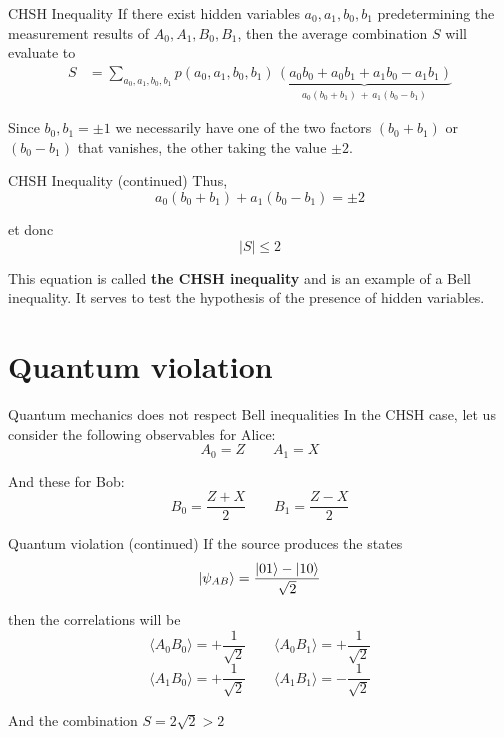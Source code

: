 \documentclass[aspectratio=169,12pt]{beamer}
\begin{document}
\begin{frame}{CHSH Inequality}
  If there exist hidden variables $a_0,a_1,b_0,b_1$ predetermining the measurement results of $A_0,A_1,B_0,B_1$, then the average combination $S$ will evaluate to
  \begin{align*}
    S &= \sum_{a_0,a_1,b_0,b_1} p(a_0,a_1,b_0,b_1) \, \underbrace{(a_0b_0+ a_0b_1 + a_1b_0 - a_1b_1)}_{a_0(b_0+b_1) \, + \, a_1(b_0-b_1)}
  \end{align*}
  
  Since $b_0,b_1 = \pm 1$ we necessarily have one of the two factors $(b_0+b_1)$ or $(b_0-b_1)$ that vanishes, the other taking the value $\pm 2$.
\end{frame}

\begin{frame}{CHSH Inequality (continued)}
  Thus,
  \[
    a_0(b_0+b_1) + a_1(b_0-b_1) = \pm 2
  \]
  
  et donc
  \[
    |S| \le 2
  \]
  
  \bigskip
  This equation is called \textbf{the CHSH inequality} and is an example of a Bell inequality. It serves to test the hypothesis of the presence of hidden variables.
\end{frame}

\section{Quantum violation}

\begin{frame}{Quantum mechanics does not respect Bell inequalities}
  In the CHSH case, let us consider the following observables for Alice:
  \[
    A_0 = Z
    \qquad
    A_1 = X
  \]
  
  And these for Bob:
  \[
    B_0 = \frac{Z+X}{2}
    \qquad
    B_1 = \frac{Z-X}{2}
  \]
\end{frame}

\begin{frame}{Quantum violation (continued)}
  If the source produces the states
  \[
    \ket{\psi_{AB}} = \frac{\ket{01} - \ket{10}}{\sqrt{2}}
  \]
  
  then the correlations will be
  \[
    \langle A_0B_0 \rangle = +\frac{1}{\sqrt{2}} \qquad
    \langle A_0B_1 \rangle = +\frac{1}{\sqrt{2}}
  \]
  \[
    \langle A_1B_0 \rangle = +\frac{1}{\sqrt{2}} \qquad
    \langle A_1B_1 \rangle = -\frac{1}{\sqrt{2}}
  \]
  
  And the combination $S = 2\sqrt{2} > 2$
\end{frame}
\end{document}
